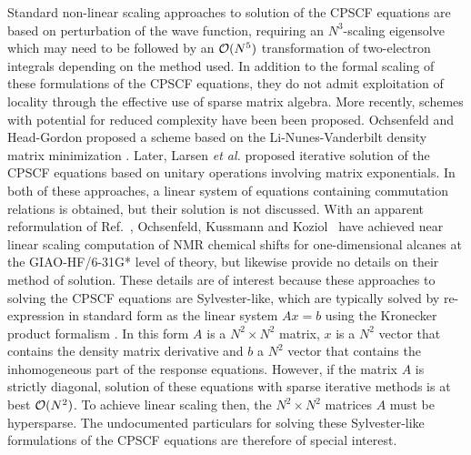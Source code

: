 \documentclass[prl,aps,letterpaper,twocolumn,showpacs,twocolumngrid,superbib]{revtex4}
\begin{document}
Standard non-linear scaling approaches to solution of the CPSCF equations 
\cite{Pople_1979,Sekino_1986,Dupuis_1991} are based on perturbation of the wave 
function, requiring an $N^3$-scaling eigensolve which may need to be followed by an ${\cal O}(N^5)$ 
transformation of two-electron integrals depending on the method used. 
In addition to the formal scaling of these formulations of the CPSCF equations, they 
do not admit exploitation of locality through the effective use of sparse matrix algebra.  
More recently, schemes with potential for reduced complexity have been been proposed.
Ochsenfeld and Head-Gordon proposed a scheme based on the Li-Nunes-Vanderbilt 
density matrix minimization \cite{Ochsenfeld97}.  Later, Larsen {\em et al.} \cite{Helgaker_2001} 
proposed iterative solution of the CPSCF equations based on unitary operations
involving matrix exponentials.    In both of these approaches, a linear system of equations 
containing commutation relations is obtained, but their solution is not discussed. 
With an apparent reformulation of Ref.~,
Ochsenfeld, Kussmann and Koziol~\cite{COchsenfeld04} have achieved near linear scaling computation
of NMR chemical shifts for one-dimensional alcanes at the GIAO-HF/6-31G* level of theory,
but likewise provide no details on their method of solution.  These details are of interest
because these approaches to solving the CPSCF equations are Sylvester-like, which are typically 
solved by re-expression in standard form as the linear system $Ax=b$ using the Kronecker product 
formalism \cite{}.  In this form $A$ is a $N^2\times N^2$ matrix, $x$ is a $N^2$ vector that 
contains the density matrix derivative and $b$ a $N^2$ vector that contains the inhomogeneous
part of the response equations.  However, if the matrix $A$ is strictly diagonal,
solution of these equations with sparse iterative methods is at best ${\cal O}(N^2)$.  
To achieve linear scaling then, the  $N^2\times N^2$ matrices $A$ must be hypersparse.
The undocumented particulars for solving these Sylvester-like formulations of the 
CPSCF equations are therefore of special interest. 

\newpage
\end{document}
